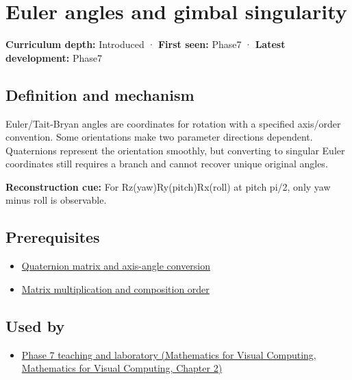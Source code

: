 \hypertarget{appendix-5f723fbd0593}{}\label{referencestart:appendix-5f723fbd0593}
\section{Euler angles and gimbal singularity}\label{appendix-5f723fbd0593-euler-angles-and-gimbal-singularity}

\textbf{Curriculum depth:} Introduced · \textbf{First seen:} Phase7 · \textbf{Latest development:} Phase7

\subsection{Definition and mechanism}\label{appendix-5f723fbd0593-definition-and-mechanism}

Euler/Tait-Bryan angles are coordinates for rotation with a specified axis/order convention. Some orientations make two parameter directions dependent. Quaternions represent the orientation smoothly, but converting to singular Euler coordinates still requires a branch and cannot recover unique original angles.

\textbf{Reconstruction cue:} For Rz(yaw)Ry(pitch)Rx(roll) at pitch pi/2, only yaw minus roll is observable.

\subsection{Prerequisites}\label{appendix-5f723fbd0593-prerequisites}

\begin{itemize}
\tightlist
\item
  \hyperref[appendix-26d8da71f6c4]{Quaternion matrix and axis-angle conversion}
\item
  \hyperref[appendix-ab31ef447dbf]{Matrix multiplication and composition order}
\end{itemize}

\subsection{Used by}\label{appendix-5f723fbd0593-used-by}

\begin{itemize}
\tightlist
\item
  \href{../02-Mathematics-for-Visual-Computing/main.pdf\#nameddest=01-foundations-i-ch018-keep-the-promises-visible-while-moving-between-representations}{Phase 7 teaching and laboratory (Mathematics for Visual Computing, Mathematics for Visual Computing, Chapter 2)}
\end{itemize}

